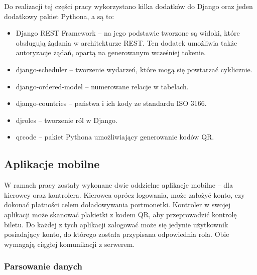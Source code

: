 \begin{singlespace}
	\label{payments_list}
	\vspace{0.3cm}
	\inputminted[fontsize=\footnotesize, linenos=true]{python}{src/imp/paypal-views.py}
\end{singlespace}

\vspace{0.3cm}
Do realizacji tej części pracy wykorzystano kilka dodatków do Django oraz jeden dodatkowy pakiet Pythona, a są to:

\begin{itemize}
	\item Django REST Framework -- na jego podstawie tworzone są widoki, które obsługują żądania w architekturze REST. Ten dodatek umożliwia także autoryzacje żądań, opartą na generowanym wcześniej tokenie.
	\item django-scheduler -- tworzenie wydarzeń, które mogą się powtarzać cyklicznie.
	\item django-ordered-model -- numerowane relacje w tabelach.
	\item django-countries -- państwa i ich kody ze standardu ISO 3166.
	\item djroles -- tworzenie ról w Django.
	\item qrcode -- pakiet Pythona umożliwiający generowanie kodów QR.
\end{itemize}

\subsection{Aplikacje mobilne}

W ramach pracy zostały wykonane dwie oddzielne aplikacje mobilne -- dla kierowcy oraz kontrolera. Kierowca oprócz logowania, może założyć konto, czy dokonać płatności celem doładowywania portmonetki. Kontroler w swojej aplikacji może skanować plakietki z kodem QR, aby przeprowadzić kontrolę biletu. Do każdej z tych aplikacji zalogować może się jedynie użytkownik posiadający konto, do którego została przypisana odpowiednia rola. Obie wymagają ciągłej komunikacji z serwerem.

\subsubsection*{Parsowanie danych}

